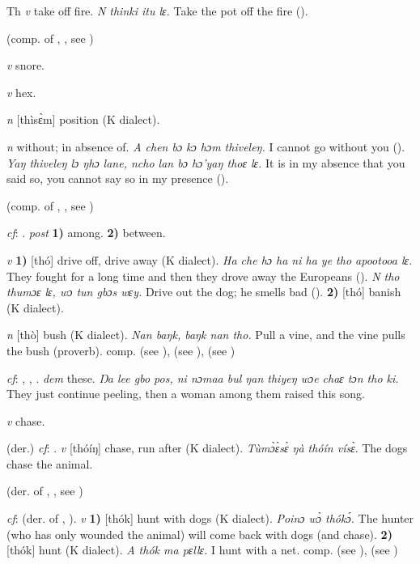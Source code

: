 \begin{letter}{Th}
 \textit{v} take off fire. \textit{N thinki itu lɛ.} Take the pot off the fire (\citealt{Pichl1967}). 

 (comp. of , , see ) 

 \textit{v} snore.

 \textit{v} hex.

 \textit{n} [thìsɛ̀m] position (K dialect). 

 \textit{n} without; in absence of. \textit{A chen bɔ kɔ hɔm thiveleŋ.} I cannot go without you (\citealt{Pichl1967}). \textit{Yaŋ thiveleŋ lɔ ŋhɔ lane, ncho lan bɔ hɔ'yaŋ thoɛ lɛ.} It is in my absence that you said so, you cannot say so in my presence (\citealt{Pichl1967}). 

 (comp. of , , see ) 

 \textit{cf}: . \textit{post} \textbf{1)} among. \textbf{2)} between.

 \textit{v} \textbf{1)} [thó] drive off, drive away (K dialect). \textit{Ha che hɔ ha ni ha ye tho apootooa lɛ.} They fought for a long time and then they drove away the Europeans (\citealt{Pichl1967}). \textit{N tho thumɔɛ lɛ, wɔ tun gbɔs wɛy.} Drive out the dog; he smells bad (\citealt{Pichl1967}). \textbf{2)} [thó] banish (K dialect). 

 \textit{n} [thò] bush (K dialect). \textit{Nan baŋk, baŋk nan tho.} Pull a vine, and the vine pulls the bush (proverb). comp.  (see ),  (see ),  (see ) 

 \textit{cf}: , , . \textit{dem} these. \textit{Ŋa lee gbo pos, ni nɔmaa bul ŋan thiyeŋ wɔe chaɛ tɔn tho ki.} They just continue peeling, then a woman among them raised this song. 

 \textit{v} chase.

 (der.) \textit{cf}: . \textit{v} [thóíŋ] chase, run after (K dialect). \textit{Tùmɔ̀ɛ̀sɛ̀ ŋà thóín vísɛ̀}. The dogs chase the animal.

 (der. of , , see ) 

 \textit{cf}:  (der. of , ). \textit{v} \textbf{1)} [thók] hunt with dogs (K dialect). \textit{Poinɔ wɔ̀ thókɔ́.} The hunter (who has only wounded the animal) will come back with dogs (and chase). \textbf{2)} [thók] hunt (K dialect). \textit{A thók ma pɛllɛ.} I hunt with a net. comp.  (see ),  (see ) 


\end{letter}
